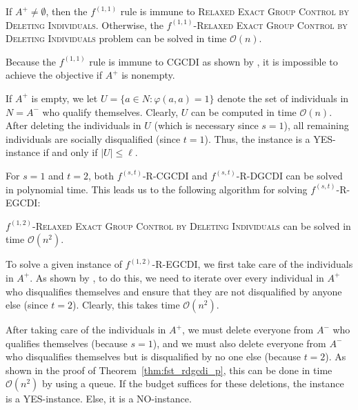\documentclass[
    12pt,               %
    a4paper,            %
    bibtotoc,           %
    pointlessnumbers,   %
    ngerman,            %
    titlepage,          %
    leqno,              %
    ]{scrarticle}       %
\newcommand\thmref{Theorem~\ref}
\begin{document}
\begin{Observation} \label{obs:f11_regcdi_i_p}
If $A^+ \neq \emptyset$, then the $f^{(1, 1)}$ rule is immune to \textsc{Relaxed Exact Group Control by Deleting Individuals}. Otherwise, the $f^{(1, 1)}$-\textsc{Relaxed Exact Group Control by Deleting Individuals} problem can be solved in time $\mathcal{O}(n)$.
\end{Observation}

\begin{Proof}
Because the $f^{(1, 1)}$ rule is immune to CGCDI as shown by \textcite[Theorem 1]{YD18}, it is impossible to achieve the objective if $A^+$ is nonempty.

If $A^+$ is empty, we let $U = \{ a \in N : \varphi(a, a) = 1 \}$ denote the set of individuals in $N = A^-$ who qualify themselves. Clearly, $U$ can be computed in time $\mathcal{O}(n)$. After deleting the individuals in $U$ (which is necessary since $s=1$), all remaining individuals are socially disqualified (since $t=1$). Thus, the instance is a YES-instance if and only if $|U| \leq \ell$.
\end{Proof}



For $s=1$ and $t=2$, both $f^{(s, t)}$-R-CGCDI and $f^{(s, t)}$-R-DGCDI can be solved in polynomial time. This leads us to the following algorithm for solving $f^{(s, t)}$-R-EGCDI:

\begin{Observation} \label{obs:f12_regcdi_p}
$f^{(1, 2)}$-\textsc{Relaxed Exact Group Control by Deleting Individuals} can be solved in time $\mathcal{O}(n^2)$.
\end{Observation}

\begin{Proof}
To solve a given instance of $f^{(1, 2)}$-R-EGCDI, we first take care of the individuals in $A^+$. As shown by \textcite[Theorem 3]{YD18}, to do this, we need to iterate over every individual in $A^+$ who disqualifies themselves and ensure that they are not disqualified by anyone else (since $t=2$). Clearly, this takes time $\mathcal{O}(n^2)$.

After taking care of the individuals in $A^+$, we must delete everyone from $A^-$ who qualifies themselves (because $s=1$), and we must also delete everyone from $A^-$ who disqualifies themselves but is disqualified by no one else (because $t=2$). As shown in the proof of \thmref{thm:fst_rdgcdi_p}, this can be done in time $\mathcal{O}(n^2)$ by using a queue. If the budget suffices for these deletions, the instance is a YES-instance. Else, it is a NO-instance.
\end{Proof}
\end{document}
